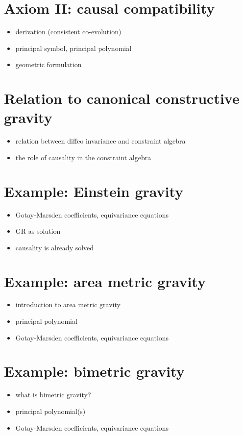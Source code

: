 \section{Axiom II: causal compatibility}

\begin{itemize}
\item derivation (consistent co-evolution)
\item principal symbol, principal polynomial
\item geometric formulation
\end{itemize}

\section{Relation to canonical constructive gravity}
\begin{itemize}
\item relation between diffeo invariance and constraint algebra
\item the role of causality in the constraint algebra
\end{itemize}

\section{Example: Einstein gravity}
\begin{itemize}
\item Gotay-Marsden coefficients, equivariance equations
\item GR as solution
\item causality is already solved
\end{itemize}

\section{Example: area metric gravity}
\begin{itemize}
\item introduction to area metric gravity
\item principal polynomial
\item Gotay-Marsden coefficients, equivariance equations
\end{itemize}

\section{Example: bimetric gravity}
\begin{itemize}
\item what is bimetric gravity?
\item principal polynomial(s)
\item Gotay-Marsden coefficients, equivariance equations
\end{itemize}

